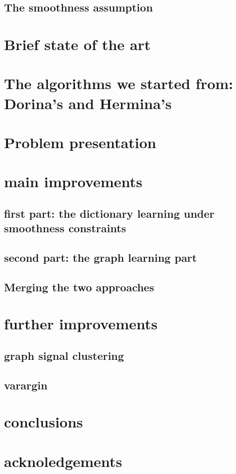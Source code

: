 \documentclass[11pt,a4paper,titlepage]{article}
\begin{document}
\subsection{The smoothness assumption}


\section{Brief state of the art}


\section{The algorithms we started from: Dorina's and Hermina's}


\section{Problem presentation}


\section{main improvements}


\subsection{first part: the dictionary learning under smoothness constraints}


\subsection{second part: the graph learning part}


\subsection{Merging the two approaches}


\section{further improvements}


\subsection{graph signal clustering}


\subsection{varargin}


\section{conclusions}


\section{acknoledgements}





\end{document}
